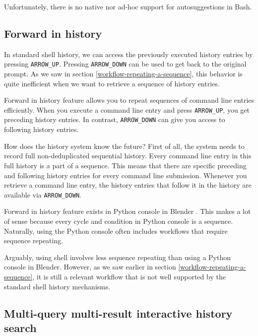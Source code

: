 Unfortunately, there is no native nor ad-hoc support for autosuggestions in Bash. 



\subsection{Forward in history}

In standard shell history, we can access the previously executed history entries by pressing \verb|ARROW_UP|. Pressing \verb|ARROW_DOWN| can be used to get back to the original prompt.
As we saw in section \ref{workflow-repeating-a-sequence}, this behavior is quite inefficient when we want to retrieve a sequence of history entries.

Forward in history feature allows you to repeat sequences of command line entries efficiently. 
When you execute a command line entry and press \verb|ARROW_UP|, you get preceding history entries. In contrast, \verb|ARROW_DOWN| can give you access to following history entries.

How does the history system know the future? First of all, the system needs to record full non-deduplicated sequential history. Every command line entry in this full history is a part of a sequence. This means that there are specific preceding and following history entries for every command line submission. Whenever you retrieve a command line entry, the history entries that follow it in the history are available via \verb|ARROW_DOWN|.


Forward in history feature exists in Python console in Blender \cite{tools-blender-docs-python-console}. This makes a lot of sense because every cycle and condition in Python console is a sequence. Naturally, using the Python console often includes workflows that require sequence repeating.

Arguably, using shell involves less sequence repeating than using a Python console in Blender. However, as we saw earlier in section \ref{workflow-repeating-a-sequence}, it is still a relevant workflow that is not well supported by the standard shell history mechanisms. 

\subsection{Multi-query multi-result interactive history search}

